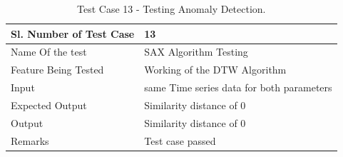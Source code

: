 \documentclass[12pt,a4paper]{report}
\begin{document}
\begin{table}
    \begin{tabular}{|l|l|}
    \hline
    Sl. Number of Test Case & 13                           \\ \hline
    Name Of the test        & SAX Algorithm Testing        \\ \hline
    Feature Being Tested    & Working of the DTW Algorithm \\ \hline
    Input                   & same Time series data for both parameters\\ \hline
    Expected Output         & Similarity distance of 0 \\ \hline
    Output                  & Similarity distance of 0 \\ \hline
    Remarks                 & Test case passed              \\ \hline
    \end{tabular}
    \caption {Test Case 13 - Testing Anomaly Detection.}
\end{table}
\end{document}
